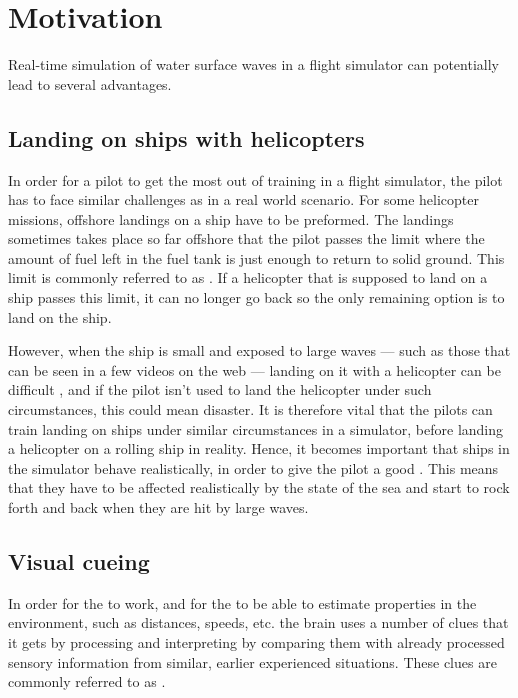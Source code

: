\chapter{Motivation}
\label{chap:motivation}

Real-time simulation of water surface waves in a flight simulator can potentially lead to several advantages.

\section{Landing on ships with helicopters}

In order for a pilot to get the most out of training in a flight simulator, the pilot has to face similar challenges as in a real world scenario. For some helicopter missions, offshore landings on a ship have to be preformed. The landings sometimes takes place so far offshore that the pilot passes the limit where the amount of fuel left in the fuel tank is just enough to return to solid ground. This limit is commonly referred to as . If a helicopter that is supposed to land on a ship passes this limit, it can no longer go back so the only remaining option is to land on the ship.

However, when the ship is small and exposed to large waves --- such as those that can be seen in a few videos on the web \citep{MrOawal2009,PrismDefence2010,KopulaDK2010} --- landing on it with a helicopter can be difficult \citep{PrismDefence2010}, and if the pilot isn't used to land the helicopter under such circumstances, this could mean disaster. It is therefore vital that the pilots can train landing on ships under similar circumstances in a simulator, before landing a helicopter on a rolling ship in reality. Hence, it becomes important that ships in the simulator behave realistically, in order to give the pilot a good . This means that they have to be affected realistically by the state of the sea and start to rock forth and back when they are hit by large waves.

\section{Visual cueing}

In order for the  to work, and for the \brain to be able to estimate properties in the environment, such as distances, speeds, etc. the brain uses a number of clues that it gets by processing and interpreting  by comparing them with already processed sensory information from similar, earlier experienced situations. These clues are commonly referred to as .


